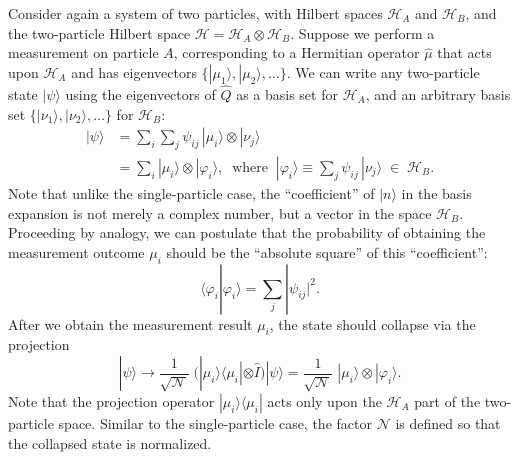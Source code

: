 \documentclass[pra,11pt]{revtex4}
\begin{document}
Consider again a system of two particles, with Hilbert spaces
$\mathscr{H}_A$ and $\mathscr{H}_B$, and the two-particle Hilbert
space $\mathscr{H} = \mathscr{H}_A \otimes \mathscr{H}_B$.  Suppose we
perform a measurement on particle $A$, corresponding to a Hermitian
operator $\hat{\mu}$ that acts upon $\mathscr{H}_A$ and has
eigenvectors $\{|\mu_1\rangle, |\mu_2\rangle,\dots\}$.  We can write
any two-particle state $|\psi\rangle$ using the eigenvectors of
$\hat{Q}$ as a basis set for $\mathscr{H}_A$, and an arbitrary basis
set $\{|\nu_1\rangle, |\nu_2\rangle,\dots\}$ for $\mathscr{H}_B$:
$$\begin{aligned}|\psi\rangle &= \sum_{i}\sum_{j} \psi_{ij}\, |\mu_i\rangle\otimes |\nu_j\rangle \\&= \sum_i |\mu_i\rangle\otimes |\varphi_i\rangle, \;\;\mathrm{where}\;\;|\varphi_i\rangle\equiv \sum_j \psi_{ij}\,|\nu_j\rangle \;\in\; \mathscr{H}_B.\end{aligned}$$
Note that unlike the single-particle case, the ``coefficient'' of
$|n\rangle$ in the basis expansion is not merely a complex number, but
a vector in the space $\mathscr{H}_B$.  Proceeding by analogy, we can
postulate that the probability of obtaining the measurement outcome
$\mu_i$ should be the ``absolute square'' of this ``coefficient'':
$$\langle \varphi_i|\varphi_i\rangle = \sum_j |\psi_{ij}|^2.$$
After we obtain the measurement result $\mu_i$, the state should collapse
via the projection
$$|\psi\rangle \longrightarrow \frac{1}{\sqrt{\mathcal{N}}}\; \Big(|\mu_i\rangle\langle \mu_i| \otimes \hat{I}\Big) |\psi\rangle = \frac{1}{\sqrt{\mathcal{N}}}\; |\mu_i\rangle\otimes |\varphi_i\rangle.$$
Note that the projection operator $|\mu_i\rangle\langle \mu_i|$ acts
only upon the $\mathscr{H}_A$ part of the two-particle space.  Similar
to the single-particle case, the factor $\mathcal{N}$ is defined so
that the collapsed state is normalized.
\end{document}

